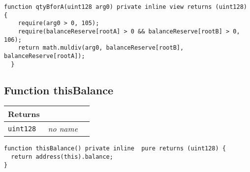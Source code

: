 \vspace{2cm}

\begin{lstlisting}[firstnumber=177]
  function qtyBforA(uint128 arg0) private inline view returns (uint128) {
    require(arg0 > 0, 105);
    require(balanceReserve[rootA] > 0 && balanceReserve[rootB] > 0, 106);
    return math.muldiv(arg0, balanceReserve[rootB], balanceReserve[rootA]);
  }
\end{lstlisting}

\subsection{Function thisBalance}


\ifsoltables
\noindent\begin{tabular}{|l|l|p{5cm}|}\hline
\multicolumn{3}{|l|}{\bf Returns}\\\hline
\tt uint128 & {\em no name} &\\\hline
\end{tabular}
\fi

\vspace{2cm}

\begin{lstlisting}[firstnumber=599]
function thisBalance() private inline  pure returns (uint128) {
  return address(this).balance;
}
\end{lstlisting}
